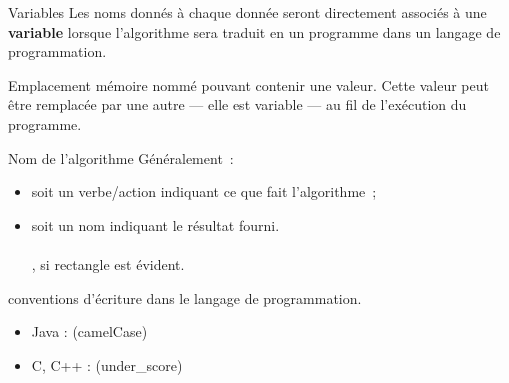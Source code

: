 \begin{frame}{Variables}
  Les noms donnés à chaque donnée seront directement associés à une 
  \textbf{variable} lorsque l'algorithme sera traduit en un programme dans 
  un langage de programmation.

  \pause
  \begin{definition}[Variable]
    Emplacement
    mémoire nommé pouvant contenir une valeur. Cette valeur peut être
    remplacée par une autre --- elle est variable --- au fil de l'exécution du
    programme.
  \end{definition}
\end{frame}

\begin{frame}{Nom de l'algorithme}
  Généralement~:
  \begin{itemize}
    \item soit un verbe/action indiquant ce que fait l’algorithme~;\\
      \pause \qquad {}
    \pause
    \item soit un nom indiquant le résultat fourni.\\
      \pause \qquad {}\\
      \pause \qquad {}, si \og rectangle \fg est évident.
  \end{itemize}

  \pause \bcattention conventions d'écriture dans le langage de programmation.
  \begin{itemize}
    \item Java :  (camelCase)
    \item C, C++ :  (under\_score)
  \end{itemize}
\end{frame}


